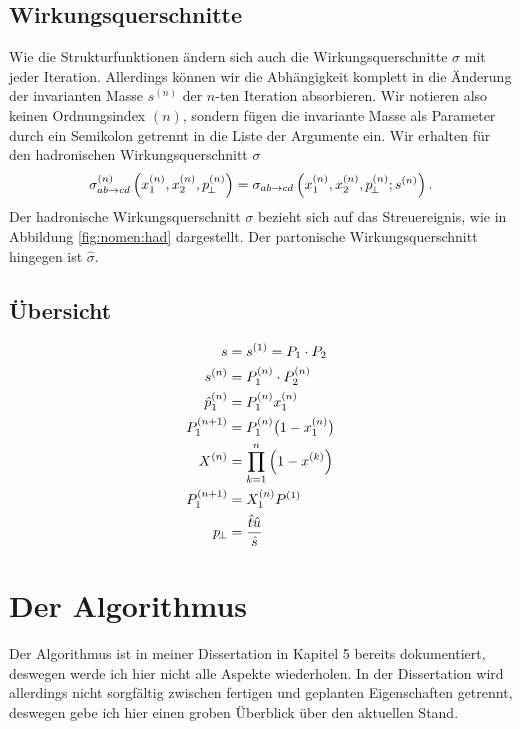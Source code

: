 \section{Wirkungsquerschnitte}
Wie die Strukturfunktionen ändern sich auch die Wirkungsquerschnitte $\sigma$ mit jeder Iteration. Allerdings können wir die Abhängigkeit komplett in die Änderung der invarianten Masse $s^{(n)}$ der $n$-ten Iteration absorbieren. Wir notieren also keinen Ordnungsindex $(n)$, sondern fügen die invariante Masse als Parameter durch ein Semikolon getrennt in die Liste der Argumente ein. Wir erhalten für den hadronischen Wirkungsquerschnitt ${\sigma}$
\begin{equation}
  {\sigma}_{ab\rightarrow cd}^{(n)}\left(x_1^{(n)},x_2^{(n)},p_{\!\perp}^{(n)}\right)
  ={\sigma}_{ab\rightarrow cd}\left(x_1^{(n)},x_2^{(n)},p_{\!\perp}^{(n)};s^{(n)}\right).
\end{equation}
Der hadronische Wirkungsquerschnitt $\sigma$ bezieht sich auf das Streuereignis, wie in Abbildung \ref{fig:nomen:had} dargestellt. Der partonische Wirkungsquerschnitt hingegen ist $\widehat{\sigma}$.
\section{Übersicht}
\begin{align}
  s&=s^{(1)}=P_1\cdot P_2\\
  s^{(n)}&=P_1^{(n)}\cdot P_2^{(n)}\\
  \hat{p}_1^{(n)}&=P_1^{(n)}x_1^{(n)}\\
  P_1^{(n+1)}&=P_1^{(n)}\big(1-x_1^{(n)}\big)\\
  X^{(n)}&=\prod_{k=1}^{n}\left(1-x^{(k)}\right)\\
  P_1^{(n+1)}&=X_1^{(n)}P^{(1)}\\
  p_{\!\perp}&=\frac{\hat{t}\hat{u}}{\hat{s}}
\end{align}
\chapter{Der Algorithmus}
Der Algorithmus ist in meiner Dissertation in Kapitel 5 bereits dokumentiert, deswegen werde ich hier nicht alle Aspekte wiederholen. In der Dissertation wird allerdings nicht sorgfältig zwischen fertigen und geplanten Eigenschaften getrennt, deswegen gebe ich hier einen groben Überblick über den aktuellen Stand.

